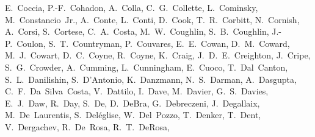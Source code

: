 {E.~Coccia, %
P.-F.~Cohadon, %
A.~Colla, %
C.~G.~Collette,  %
L.~Cominsky, %
M.~Constancio~Jr.,  %
A.~Conte, %
L.~Conti, %
D.~Cook,  %
T.~R.~Corbitt,  %
N.~Cornish,  %
A.~Corsi,  %
S.~Cortese, %
C.~A.~Costa,  %
M.~W.~Coughlin,  %
S.~B.~Coughlin,  %
J.-P.~Coulon, %
S.~T.~Countryman,  %
P.~Couvares,  %
E.~E.~Cowan,  %
D.~M.~Coward,  %
M.~J.~Cowart,  %
D.~C.~Coyne,  %
R.~Coyne,  %
K.~Craig,  %
J.~D.~E.~Creighton,  %
J.~Cripe,  %
S.~G.~Crowder,  %
A.~Cumming,  %
L.~Cunningham,  %
E.~Cuoco, %
T.~Dal~Canton,  %
S.~L.~Danilishin,  %
S.~D'Antonio, %
K.~Danzmann,  %
N.~S.~Darman,  %
A.~Dasgupta,  %
C.~F.~Da~Silva~Costa,  %
V.~Dattilo, %
I.~Dave,  %
M.~Davier, %
G.~S.~Davies,  %
E.~J.~Daw,  %
R.~Day, %
S.~De,	%
D.~DeBra,  %
G.~Debreczeni, %
J.~Degallaix, %
M.~De~Laurentis, %
S.~Del\'eglise, %
W.~Del~Pozzo,  %
T.~Denker,  %
T.~Dent,  %
V.~Dergachev,  %
R.~De~Rosa, %
R.~T.~DeRosa,  %
}
